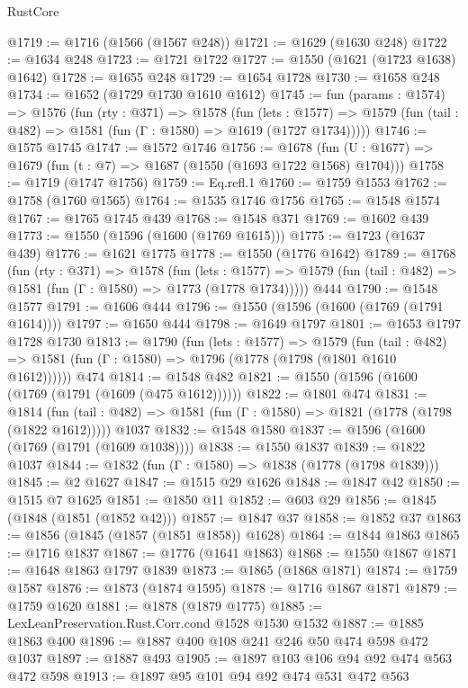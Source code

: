 \begin{lexlean}{RustCore}
\begin{coremodule}
@1719 := @1716 (@1566 (@1567 @248))
@1721 := @1629 (@1630 @248)
@1722 := @1634 @248
@1723 := @1721 @1722
@1727 := @1550 (@1621 (@1723 @1638) @1642)
@1728 := @1655 @248
@1729 := @1654 @1728
@1730 := @1658 @248
@1734 := @1652 (@1729 @1730 @1610 @1612)
@1745 := fun (params : @1574) =>
  @1576
    (fun (rty : @371) =>
    @1578
      (fun (lets : @1577) =>
      @1579 (fun (tail : @482) => @1581 (fun (Γ : @1580) => @1619 (@1727 @1734)))))
@1746 := @1575 @1745
@1747 := @1572 @1746
@1756 := @1678 (fun (U : @1677) => @1679 (fun (t : @7) => @1687 (@1550 (@1693 @1722 @1568) @1704)))
@1758 := @1719 (@1747 @1756)
@1759 := Eq.refl.{1}
@1760 := @1759 @1553
@1762 := @1758 (@1760 @1565)
@1764 := @1535 @1746 @1756
@1765 := @1548 @1574
@1767 := @1765 @1745 @439
@1768 := @1548 @371
@1769 := @1602 @439
@1773 := @1550 (@1596 (@1600 (@1769 @1615)))
@1775 := @1723 (@1637 @439)
@1776 := @1621 @1775
@1778 := @1550 (@1776 @1642)
@1789 := @1768
    (fun (rty : @371) =>
    @1578
      (fun (lets : @1577) =>
      @1579 (fun (tail : @482) => @1581 (fun (Γ : @1580) => @1773 (@1778 @1734)))))
    @444
@1790 := @1548 @1577
@1791 := @1606 @444
@1796 := @1550 (@1596 (@1600 (@1769 (@1791 @1614))))
@1797 := @1650 @444
@1798 := @1649 @1797
@1801 := @1653 @1797 @1728 @1730
@1813 := @1790
    (fun (lets : @1577) =>
    @1579
      (fun (tail : @482) => @1581 (fun (Γ : @1580) => @1796 (@1778 (@1798 (@1801 @1610 @1612))))))
    @474
@1814 := @1548 @482
@1821 := @1550 (@1596 (@1600 (@1769 (@1791 (@1609 (@475 @1612))))))
@1822 := @1801 @474
@1831 := @1814
    (fun (tail : @482) => @1581 (fun (Γ : @1580) => @1821 (@1778 (@1798 (@1822 @1612)))))
    @1037
@1832 := @1548 @1580
@1837 := @1596 (@1600 (@1769 (@1791 (@1609 @1038))))
@1838 := @1550 @1837
@1839 := @1822 @1037
@1844 := @1832 (fun (Γ : @1580) => @1838 (@1778 (@1798 @1839)))
@1845 := @2 @1627
@1847 := @1515 @29 @1626
@1848 := @1847 @42
@1850 := @1515 @7 @1625
@1851 := @1850 @11
@1852 := @603 @29
@1856 := @1845 (@1848 (@1851 (@1852 @42)))
@1857 := @1847 @37
@1858 := @1852 @37
@1863 := @1856 (@1845 (@1857 (@1851 @1858)) @1628)
@1864 := @1844 @1863
@1865 := @1716 @1837
@1867 := @1776 (@1641 @1863)
@1868 := @1550 @1867
@1871 := @1648 @1863 @1797 @1839
@1873 := @1865 (@1868 @1871)
@1874 := @1759 @1587
@1876 := @1873 (@1874 @1595)
@1878 := @1716 @1867 @1871
@1879 := @1759 @1620
@1881 := @1878 (@1879 @1775)
@1885 := LexLeanPreservation.Rust.Corr.cond @1528 @1530 @1532
@1887 := @1885 @1863 @400
@1896 := @1887 @400 @108 @241 @246 @50 @474 @598 @472 @1037
@1897 := @1887 @493
@1905 := @1897 @103 @106 @94 @92 @474 @563 @472 @598
@1913 := @1897 @95 @101 @94 @92 @474 @531 @472 @563

\end{coremodule}
\end{lexlean}
